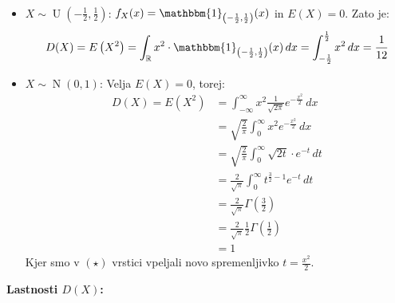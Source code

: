 \documentclass[12pt]{book}
\def\n{\noindent}
\theoremstyle{definition}
\theoremstyle{plain}
\theoremstyle{plain}
\theoremstyle{plain}
\theoremstyle{plain}
\theoremstyle{remark}
\begin{document}
\begin{zgled}
    ~

    \begin{itemize}
        \item $X \sim \operatorname{U}\left(-\frac{1}{2}, \frac{1}{2}\right)$: $f_X(x)=\mathbbm{1}_{\left(-\frac{1}{2}, \frac{1}{2}\right)}(x)$ in $E(X)=0$. Zato je: 
        $$
        D(X)=E\left(X^2\right)=\int_{\mathbb{R}} x^2 \cdot \mathbbm{1}_{\left(-\frac{1}{2}, \frac{1}{2}\right)}(x) \, d x =\int_{-\frac{1}{2}}^{\frac{1}{2}} x^2 \, d x=\frac{1}{12}
        $$
        \item $X \sim \operatorname{N}(0,1)$: Velja $E(X)=0$, torej: 
        \begin{align*}
            D(X)=E\left(X^2\right)&=\int_{-\infty}^{\infty} x^2 \frac{1}{\sqrt{2 \pi}}  e^{-\frac{x^2}{2}} \, d x \\
            &=\sqrt{\frac{2}{\pi}} \int_0^{\infty} x^2 e^{-\frac{x^2}{2}} \, d x \tag{$\star$}\\ 
            &=\sqrt{\frac{2}{\pi}} \int_0^{\infty} \sqrt{2 t} \cdot e^{-t} \,d t \\
            &=\frac{2}{\sqrt{\pi}} \int_0^{\infty} t^{\frac{3}{2}-1} e^{-t} \, d t \\
            &=\frac{2}{\sqrt{\pi}} \Gamma\left(\frac{3}{2}\right) \\
            &=\frac{2}{\sqrt{\pi}} \frac{1}{2} \Gamma\left(\frac{1}{2}\right) \\
            &=1
        \end{align*}
        Kjer smo v $(\star)$ vrstici vpeljali novo spremenljivko $t=\frac{x^2}{2}$.
    \end{itemize}
\end{zgled}

\n \textbf{Lastnosti $D(X)$:}
\end{document}
